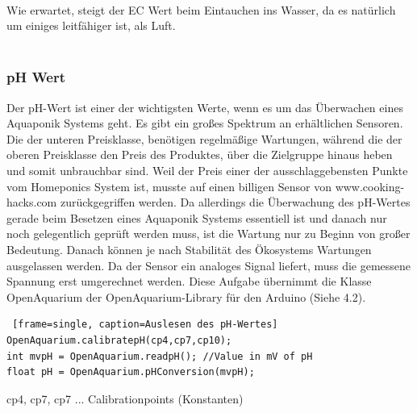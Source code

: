 \vskip0.5cm \mbox{} \\
Wie erwartet, steigt der \gls{EC} Wert beim Eintauchen ins Wasser, da es nat\"urlich um einiges leitf\"ahiger ist, als Luft. \\ \mbox{} \\

\newpage

\subsubsection{pH Wert}
Der pH-Wert ist einer der wichtigsten Werte, wenn es um das \"Uberwachen eines Aquaponik Systems geht. Es gibt ein gro{\ss}es Spektrum an erh\"altlichen Sensoren. Die der unteren Preisklasse, ben\"otigen regelm\"a{\ss}ige Wartungen, während die der oberen Preisklasse den Preis des Produktes, \"uber die Zielgruppe hinaus heben und somit unbrauchbar sind. Weil der Preis einer der ausschlaggebensten Punkte vom Homeponics System ist, musste auf einen billigen Sensor von www.cooking-hacks.com zurückgegriffen werden. Da allerdings die Überwachung des pH-Wertes gerade beim Besetzen eines Aquaponik Systems essentiell ist und danach nur noch gelegentlich geprüft werden muss, ist die Wartung nur zu Beginn von großer Bedeutung. Danach können je nach Stabilität des Ökosystems Wartungen ausgelassen werden. Da der Sensor ein analoges Signal liefert, muss die gemessene Spannung erst umgerechnet werden. Diese Aufgabe \"ubernimmt die Klasse OpenAquarium der OpenAquarium-Library für den Arduino (Siehe 4.2). \cite{pHsensor, abcChemie} \\

\begin{lstlisting} [frame=single, caption=Auslesen des pH-Wertes]
OpenAquarium.calibratepH(cp4,cp7,cp10);
int mvpH = OpenAquarium.readpH(); //Value in mV of pH
float pH = OpenAquarium.pHConversion(mvpH);
\end{lstlisting}
cp4, cp7, cp7 ... Calibrationpoints (Konstanten)

